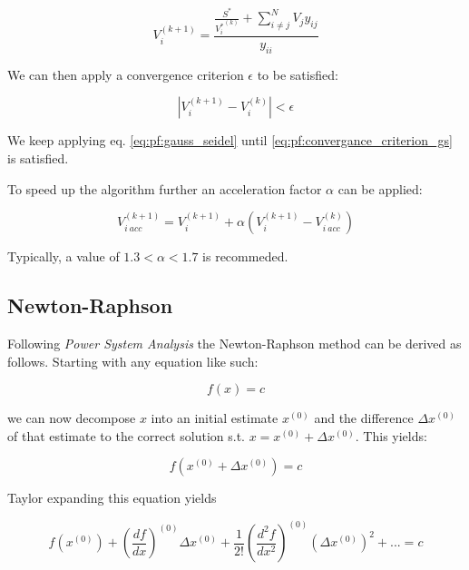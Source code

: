 \begin{equation}
    V_i^{(k+1)} = \frac{\frac{S^*}{{V_i^*}^{(k)}} + \sum_{i \ne j}^N V_j y_{ij}}{y_{ii}}
    \label{eq:pf:gauss_seidel}
\end{equation}

We can then apply a convergence criterion $\epsilon$ to be satisfied:

\begin{equation}
    |V_i^{(k+1)} - V_i^{(k)}| < \epsilon
    \label{eq:pf:convergance_criterion_gs}
\end{equation}

We keep applying eq. \ref{eq:pf:gauss_seidel} until \ref{eq:pf:convergance_criterion_gs}
is satisfied.

To speed up the algorithm further an acceleration factor $\alpha$ can be applied:

\begin{equation}
    V_{i \ acc}^{(k+1)} = V_i^{(k + 1)} + \alpha(V_i^{(k + 1)} - V_{i \ acc}^{(k)})
    \label{eq:pf:gs_pf}
\end{equation}

Typically, a value of $1.3 < \alpha < 1.7$ is recommeded\autocite{power_system_analysis}.

\subsection{Newton-Raphson}

Following \textit{Power System Analysis}\autocite{power_system_analysis} the Newton-Raphson method can be derived as follows. Starting with any equation like such:

\begin{equation}
    f(x) = c
    \label{eq:pf:nr_start_point}
\end{equation}

we can now decompose $x$ into an initial estimate $x^{(0)}$ 
and the difference $\Delta x^{(0)}$ of that estimate to the correct solution s.t.
$x = x^{(0)} + \Delta x^{(0)}$. This yields:

\begin{equation}
    f(x^{(0)} + \Delta x^{(0)}) = c
\end{equation}

Taylor expanding this equation yields

\begin{equation}
    f(x^{(0)}) + (\frac{df}{dx})^{(0)} \Delta x^{(0)} + \frac{1}{2!} (\frac{d^2f}{dx^2})^{(0)} (\Delta x^{(0)})^2 + ... = c
\end{equation}

